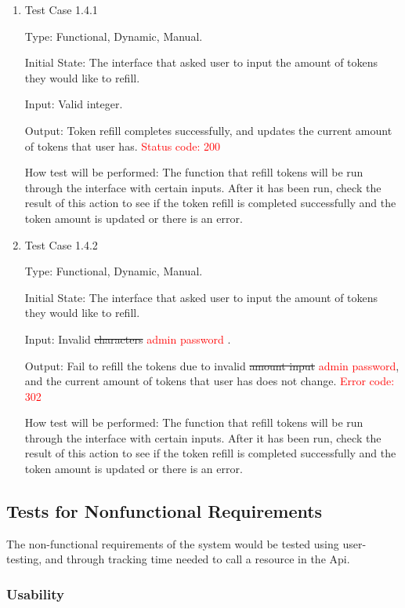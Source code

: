 \documentclass[12pt, titlepage]{article}
\begin{document}
\begin{enumerate}

\item{Test Case 1.4.1\\}

Type: Functional, Dynamic, Manual.
					
Initial State: The interface that asked user to input the amount of tokens they would like to refill.
					
Input: Valid integer.
					
Output: Token refill completes successfully, and updates the current amount of tokens that user has. \textcolor{red}{Status code: 200}
					
How test will be performed: The function that refill tokens will be run through the interface with certain inputs. After it has been run, check the result of this action to see if the token refill is completed successfully and the token amount is updated or there is an error.

\item{Test Case 1.4.2\\}

Type: Functional, Dynamic, Manual.
					
Initial State: The interface that asked user to input the amount of tokens they would like to refill.
					
Input: Invalid \st{characters} \textcolor{red}{admin password} .
					
Output: Fail to refill the tokens due to invalid \st{amount input} \textcolor{red}{admin password}, and the current amount of tokens that user has does not change. \textcolor{red}{Error code: 302}
					
How test will be performed: The function that refill tokens will be run through the interface with certain inputs. After it has been run, check the result of this action to see if the token refill is completed successfully and the token amount is updated or there is an error.

\end{enumerate}

\subsection{Tests for Nonfunctional Requirements}
The non-functional requirements of the system would be tested using user-testing, and through tracking time needed to call a resource in the Api.

\subsubsection{Usability}
		
\end{document}
